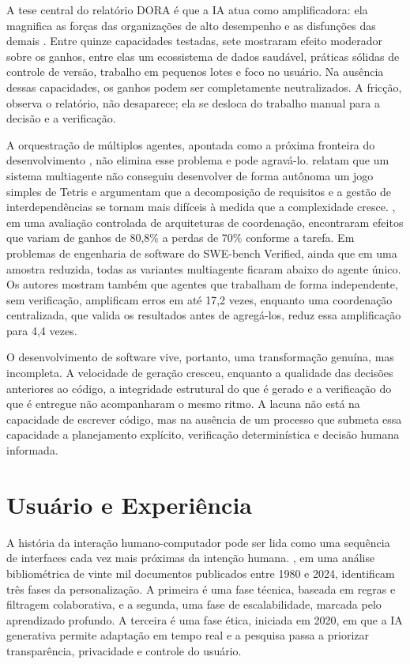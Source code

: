 A tese central do relatório DORA é que a IA atua como amplificadora: ela magnifica as forças das organizações de alto desempenho e as disfunções das demais \cite{dora2025}. Entre quinze capacidades testadas, sete mostraram efeito moderador sobre os ganhos, entre elas um ecossistema de dados saudável, práticas sólidas de controle de versão, trabalho em pequenos lotes e foco no usuário. Na ausência dessas capacidades, os ganhos podem ser completamente neutralizados. A fricção, observa o relatório, não desaparece; ela se desloca do trabalho manual para a decisão e a verificação.

A orquestração de múltiplos agentes, apontada como a próxima fronteira do desenvolvimento \cite{anthropic2026trends}, não elimina esse problema e pode agravá-lo.  relatam que um sistema multiagente não conseguiu desenvolver de forma autônoma um jogo simples de Tetris e argumentam que a decomposição de requisitos e a gestão de interdependências se tornam mais difíceis à medida que a complexidade cresce. , em uma avaliação controlada de arquiteturas de coordenação, encontraram efeitos que variam de ganhos de 80,8\% a perdas de 70\% conforme a tarefa. Em problemas de engenharia de software do SWE-bench Verified, ainda que em uma amostra reduzida, todas as variantes multiagente ficaram abaixo do agente único. Os autores mostram também que agentes que trabalham de forma independente, sem verificação, amplificam erros em até 17,2 vezes, enquanto uma coordenação centralizada, que valida os resultados antes de agregá-los, reduz essa amplificação para 4,4 vezes.

O desenvolvimento de software vive, portanto, uma transformação genuína, mas incompleta. A velocidade de geração cresceu, enquanto a qualidade das decisões anteriores ao código, a integridade estrutural do que é gerado e a verificação do que é entregue não acompanharam o mesmo ritmo. A lacuna não está na capacidade de escrever código, mas na ausência de um processo que submeta essa capacidade a planejamento explícito, verificação determinística e decisão humana informada.

\section{Usuário e Experiência}\label{sec:2.3}

A história da interação humano-computador pode ser lida como uma sequência de interfaces cada vez mais próximas da intenção humana. , em uma análise bibliométrica de vinte mil documentos publicados entre 1980 e 2024, identificam três fases da personalização. A primeira é uma fase técnica, baseada em regras e filtragem colaborativa, e a segunda, uma fase de escalabilidade, marcada pelo aprendizado profundo. A terceira é uma fase ética, iniciada em 2020, em que a IA generativa permite adaptação em tempo real e a pesquisa passa a priorizar transparência, privacidade e controle do usuário.

